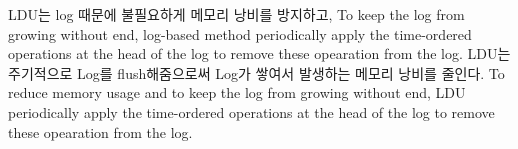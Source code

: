 












\fi



\ifkor
LDU는 log 때문에 불필요하게 메모리 낭비를 방지하고, To keep the log from growing without end,
log-based method periodically apply the time-ordered operations at the head of
the log to remove these opearation from the log.
LDU는 주기적으로 Log를 flush해줌으로써 Log가 쌓여서 발생하는 메모리 낭비를 줄인다.
\else
To reduce memory usage and to keep the log from growing without end, LDU
periodically apply the time-ordered operations at the head of the log to remove
these opearation from the log.

\fi




